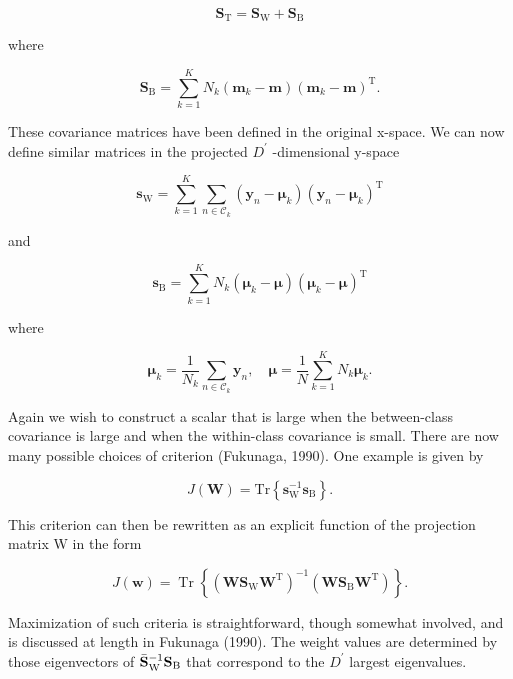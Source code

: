 \documentclass[
  10
]{article}
\begin{document}
\[
\mathbf {S} _ {\mathrm{T}} = \mathbf {S} _ {\mathrm{W}} + \mathbf {S} _ {\mathrm{B}}\tag{4.45}
\]

where

\[
\mathbf {S} _ {\mathrm{B}} = \sum_ {k = 1} ^ {K} N _ {k} (\mathbf {m} _ {k} - \mathbf {m}) (\mathbf {m} _ {k} - \mathbf {m}) ^ {\mathrm{T}}.\tag{4.46}
\]

These covariance matrices have been defined in the original x-space. We
can now define similar matrices in the projected \(D ^ { \prime }\)
-dimensional y-space

\[
\mathbf {s} _ {\mathrm{W}} = \sum_ {k = 1} ^ {K} \sum_ {n \in \mathcal {C} _ {k}} (\mathbf {y} _ {n} - \boldsymbol {\mu} _ {k}) (\mathbf {y} _ {n} - \boldsymbol {\mu} _ {k}) ^ {\mathrm{T}}\tag{4.47}
\]

and

\[
\mathbf {s} _ {\mathrm{B}} = \sum_ {k = 1} ^ {K} N _ {k} (\boldsymbol {\mu} _ {k} - \boldsymbol {\mu}) (\boldsymbol {\mu} _ {k} - \boldsymbol {\mu}) ^ {\mathrm{T}}\tag{4.48}
\]

where

\[
\boldsymbol {\mu} _ {k} = \frac {1}{N _ {k}} \sum_ {n \in \mathcal {C} _ {k}} \mathbf {y} _ {n}, \quad \boldsymbol {\mu} = \frac {1}{N} \sum_ {k = 1} ^ {K} N _ {k} \boldsymbol {\mu} _ {k}.\tag{4.49}
\]

Again we wish to construct a scalar that is large when the between-class
covariance is large and when the within-class covariance is small. There
are now many possible choices of criterion (Fukunaga, 1990). One example
is given by

\[
J (\mathbf {W}) = \mathrm{Tr} \left\{\mathbf {s} _ {\mathrm{W}} ^ {- 1} \mathbf {s} _ {\mathrm{B}} \right\}.\tag{4.50}
\]

This criterion can then be rewritten as an explicit function of the
projection matrix W in the form

\[
J (\mathbf {w}) = \operatorname{Tr} \left\{\left(\mathbf {W S} _ {\mathrm{W}} \mathbf {W} ^ {\mathrm{T}}\right) ^ {- 1} \left(\mathbf {W S} _ {\mathrm{B}} \mathbf {W} ^ {\mathrm{T}}\right) \right\}.\tag{4.51}
\]

Maximization of such criteria is straightforward, though somewhat
involved, and is discussed at length in Fukunaga (1990). The weight
values are determined by those eigenvectors of
\(\bar { \bf S } _ { \mathrm { W } } ^ { - 1 } { \bf S } _ { \mathrm { B } }\)
that correspond to the \(D ^ { \prime }\) largest eigenvalues.
\end{document}

